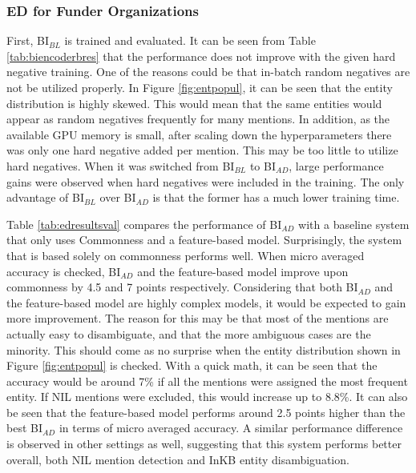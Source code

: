 \documentclass{report}
\theoremstyle{definition}
\theoremstyle{remark}
\begin{document}
\subsubsection{ED for Funder Organizations}

First, BI$_{BL}$ is trained and evaluated. It can be seen from Table \ref{tab:biencoderbres} that the performance does not improve with the given hard negative training. One of the reasons could be that in-batch random negatives are not be utilized properly. In Figure \ref{fig:entpopul}, it can be seen that the entity distribution is highly skewed. This would mean that the same entities would appear as random negatives frequently for many mentions. In addition, as the available GPU memory is small, after scaling down the hyperparameters there was only one hard negative added per mention. This may be too little to utilize hard negatives. When it was switched from BI$_{BL}$ to BI$_{AD}$, large performance gains were observed when hard negatives were included in the training. The only advantage of BI$_{BL}$ over BI$_{AD}$ is that the former has a much lower training time.

Table \ref{tab:edresultsval} compares the performance of BI$_{AD}$ with a baseline system that only uses Commonness and a feature-based model. Surprisingly, the system that is based solely on commonness performs well. When micro averaged accuracy is checked, BI$_{AD}$ and the feature-based model improve upon commonness by 4.5 and 7 points respectively. Considering that both BI$_{AD}$ and the feature-based model are highly complex models, it would be expected to gain more improvement. The reason for this may be that most of the mentions are actually easy to disambiguate, and that the more ambiguous cases are the minority. This should come as no surprise when the entity distribution shown in Figure \ref{fig:entpopul} is checked. With a quick math, it can be seen that the accuracy would be around 7\% if all the mentions were assigned the most frequent entity. If NIL mentions were excluded, this would increase up to 8.8\%. It can also be seen that the feature-based model performs around 2.5 points higher than the best BI$_{AD}$ in terms of micro averaged accuracy. A similar performance difference is observed in other settings as well, suggesting that this system performs better overall, both NIL mention detection and InKB entity disambiguation.
\end{document}
